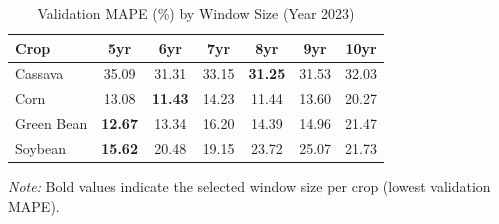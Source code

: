 \documentclass[conference]{IEEEtran}
\begin{document}
\begin{table}[htbp]
  \centering
  \caption{Validation MAPE (\%) by Window Size (Year 2023)}
  \label{tab:window_selection}
  \begin{tabular}{lcccccc}
    \toprule
    \textbf{Crop} & \textbf{5yr} & \textbf{6yr} & \textbf{7yr} & \textbf{8yr} & \textbf{9yr} & \textbf{10yr} \\
    \midrule
    Cassava    & 35.09 & 31.31 & 33.15 & \textbf{31.25} & 31.53 & 32.03 \\
    Corn       & 13.08 & \textbf{11.43} & 14.23 & 11.44 & 13.60 & 20.27 \\
    Green Bean & \textbf{12.67} & 13.34 & 16.20 & 14.39 & 14.96 & 21.47 \\
    Soybean    & \textbf{15.62} & 20.48 & 19.15 & 23.72 & 25.07 & 21.73 \\
    \bottomrule
  \end{tabular}
  \vspace{2pt}
  \raggedright\scriptsize\textit{Note:} Bold values indicate the selected window size per crop (lowest validation MAPE).
\end{table}
\end{document}
